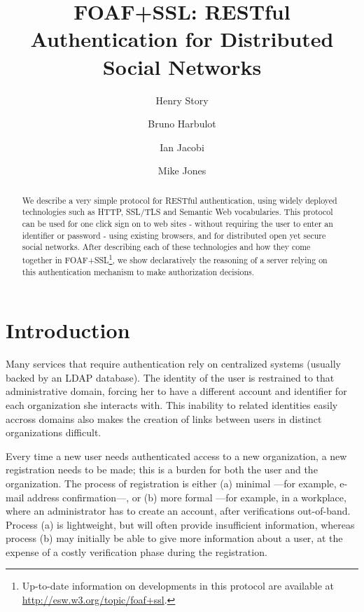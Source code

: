 \documentclass{llncs}
\begin{document}
\title{FOAF+SSL: RESTful Authentication for Distributed Social Networks}
\author{Henry Story \and Bruno Harbulot \and Ian Jacobi \and Mike Jones}

\maketitle
\begin{abstract} 
 We describe a very simple protocol for RESTful authentication, using
 widely deployed technologies such as HTTP, SSL/TLS and Semantic Web
 vocabularies.  This protocol can be used for one click sign on to web sites - 
 without requiring the user to enter an identifier or password - using existing 
 browsers, and for distributed open yet secure social networks. 
 After describing each of these technologies and how
 they come together in FOAF+SSL\footnote{Up-to-date information on
   developments in this protocol are available at
   \url{http://esw.w3.org/topic/foaf+ssl}.}, we show declaratively the
 reasoning of a server relying on this authentication mechanism to
 make authorization decisions.
\end{abstract}
\section{Introduction}

Many services that require authentication rely on centralized systems
(usually backed by an LDAP database).  The identity of the user is restrained
to that administrative domain, forcing her to have a different account and identifier
for each organization she interacts with. This inability to related identities easily accross
domains also makes the creation of links between  users in distinct organizations 
difficult. 

Every time a new user needs authenticated access to a new
organization, a new registration needs to be made; this is a burden
for both the user and the organization. The process of registration is
either (a) minimal ---for example, e-mail address confirmation---, or
(b) more formal ---for example, in a workplace, where an
administrator has to create an account, after verifications
out-of-band. Process (a) is lightweight, but will often provide
insufficient information, whereas process (b) may initially be able to give more
information about a user, at the expense of a costly
verification phase during the registration.
\end{document}
